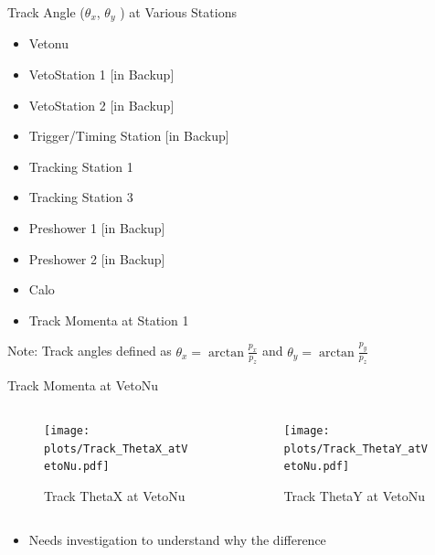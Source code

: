 \begin{frame}{Track Angle (\(\theta_x\), \(\theta_y \) ) at Various Stations}
	\begin{itemize}
		\item Vetonu
		\item VetoStation 1 [in Backup]
		\item VetoStation 2 [in Backup]
		\item Trigger/Timing Station [in Backup]
		\item Tracking Station 1
		\item Tracking Station 3
		\item Preshower 1 [in Backup]
		\item Preshower 2 [in Backup]
		\item Calo
		\item Track Momenta at Station 1
	\end{itemize}
	Note: Track angles defined as \( \theta_x = \arctan\frac{p_x}{p_z}\) and \( \theta_y = \arctan\frac{p_y}{p_z}\)
\end{frame}

\begin{frame}{Track Momenta at VetoNu}
	\begin{columns}
		\begin{column}{0.5\textwidth}
			\begin{figure}
				\texttt{[image: \\plots/Track\_ThetaX\_atVetoNu.pdf]}
				\caption{Track ThetaX at VetoNu}
			\end{figure}
		\end{column}
		\begin{column}{0.5\textwidth}
			\begin{figure}
				\texttt{[image: \\plots/Track\_ThetaY\_atVetoNu.pdf]}
				\caption{Track ThetaY at VetoNu}
			\end{figure}
		\end{column}
	\end{columns}
	\begin{itemize}
		\item Needs investigation to understand why the difference
	\end{itemize}
\end{frame}

